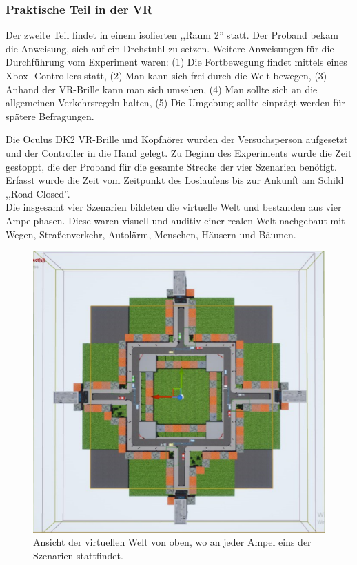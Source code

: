 \documentclass{Paper}
\begin{document}
\subsubsection{Praktische Teil in der VR}
Der zweite Teil findet in einem isolierten ,,Raum 2'' statt. Der Proband
bekam die Anweisung, sich auf ein Drehstuhl zu setzen. Weitere Anweisungen für die
Durchführung vom Experiment waren: (1) Die Fortbewegung findet mittels eines Xbox-
Controllers statt, (2) Man kann sich frei durch die Welt bewegen, (3) Anhand der VR-Brille
kann man sich umsehen, (4) Man sollte sich an die allgemeinen Verkehrsregeln halten, (5)
Die Umgebung sollte einprägt werden für spätere Befragungen.
\par
Die Oculus DK2 VR-Brille und Kopfhörer wurden der Versuchsperson aufgesetzt und der Controller in die Hand gelegt. Zu Beginn des Experiments wurde die Zeit gestoppt, die der Proband für die
gesamte Strecke der vier Szenarien benötigt. Erfasst wurde die Zeit vom Zeitpunkt des Loslaufens bis zur Ankunft am Schild ,,Road Closed''. \\
Die insgesamt vier Szenarien bildeten die
virtuelle Welt und bestanden aus vier Ampelphasen. Diese waren visuell und auditiv einer
realen Welt nachgebaut mit Wegen, Straßenverkehr, Autolärm, Menschen, Häusern und
Bäumen. 

\begin{figure}[H]
\centering
\includegraphics[scale=0.6]{bilder/map.png}
\caption{Ansicht der virtuellen Welt von oben, wo an jeder Ampel eins der Szenarien stattfindet.}
\end{figure}
\end{document}
